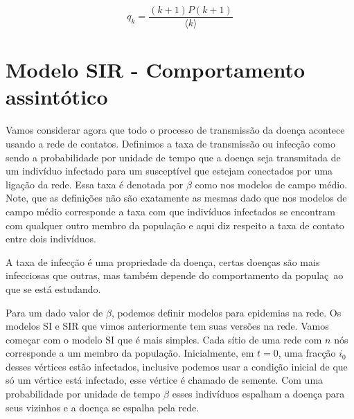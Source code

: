 \documentclass[a4paper,11pt]{report}
\begin{document}
\begin{equation}
q_k=\frac{(k+1)P(k+1)}{\langle k\rangle}
\label{eq:excess-degree}
\end{equation}

\section{Modelo SIR - Comportamento assint\'otico}
\label{subsec:SIR-perc}

Vamos considerar agora que todo o processo de transmiss\~ao da doen\c{c}a acontece usando a rede de contatos. Definimos a taxa de transmiss\~ao ou infec\c{c}\~ao como sendo a probabilidade por unidade de tempo que a doen\c{c}a seja transmitada de um indiv\'iduo infectado para um suscept\'ivel que estejam conectados por uma liga\c{c}\~ao da rede. Essa taxa \'e denotada por $\beta$ como nos modelos de campo m\'edio. Note, que as defini\c{c}\~oes n\~ao s\~ao exatamente as mesmas dado que nos modelos de campo m\'edio corresponde a taxa com que indiv\'iduos infectados se encontram com qualquer outro membro da popula\c{c}\~ao e aqui diz respeito a taxa de contato entre dois indiv\'iduos. 

A taxa de infec\c{c}\~ao \'e uma propriedade da doen\c{c}a, certas doen\c{c}as s\~ao mais infecciosas que outras, mas tamb\'em depende do 
comportamento da popula\c{c}~ao que se est\'a estudando. 

Para um dado valor de $\beta$, podemos definir modelos para epidemias na rede. Os modelos SI e SIR que vimos anteriormente tem suas vers\~oes na rede. Vamos come\c{c}ar com o modelo SI que \'e mais simples. Cada s\'itio de uma rede com $n$ n\'os corresponde a um membro da popula\c{c}\~ao. Inicialmente, em $t=0$, uma frac\c{c}\~ao $i_0$ desses v\'ertices est\~ao infectados, inclusive podemos usar a condi\c{c}\~ao inicial de que s\'o um v\'ertice est\'a infectado, esse v\'ertice \'e chamado de semente. Com uma probabilidade por unidade de tempo $\beta$ esses indiv\'iduos espalham a doen\c{c}a para seus vizinhos e a doen\c{c}a se espalha pela rede. 
\end{document}
